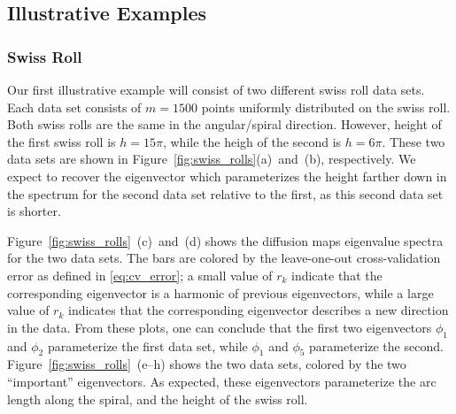 \documentclass[preprint]{elsarticle}
\begin{document}
\subsection{Illustrative Examples}


\subsubsection{Swiss Roll}

Our first illustrative example will consist of two different swiss roll data sets.
%
Each data set consists of $m=1500$ points uniformly distributed on the swiss roll. 
%
Both swiss rolls are the same in the angular/spiral direction.
%
However, height of the first swiss roll is $h = 15 \pi$, while the heigh of the second is $h = 6 \pi$. 
%
These two data sets are shown in Figure~\ref{fig:swiss_rolls}(a)~and~(b), respectively.
%
We expect to recover the eigenvector which parameterizes the height farther down in the spectrum for the second data set relative to the first, as this second data set is shorter.

Figure~\ref{fig:swiss_rolls}~(c)~and~(d) shows the diffusion maps eigenvalue spectra for the two data sets.
%
The bars are colored by the leave-one-out cross-validation error as defined in \eqref{eq:cv_error}; a small value of $r_k$ indicate that the corresponding eigenvector is a harmonic of previous eigenvectors, while a large value of $r_k$ indicates that the corresponding eigenvector describes a new direction in the data. 
%
From these plots, one can conclude that the first two eigenvectors $\phi_1$ and $\phi_2$ parameterize the first data set, while $\phi_1$ and $\phi_5$ parameterize the second. 
%
Figure~\ref{fig:swiss_rolls}~(e--h) shows the two data sets, colored by the two ``important'' eigenvectors. 
%
As expected, these eigenvectors parameterize the arc length along the spiral, and the height of the swiss roll. 
\end{document}
